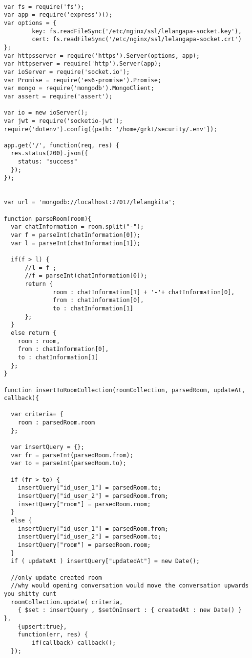 \begin{lstlisting}[label=sc-socket-chat,style=htmlcssjs,caption=Kode Sumber Implementasi Node.js + Socket.io untuk \textit{Chat}]

var fs = require('fs');
var app = require('express')();
var options = {
        key: fs.readFileSync('/etc/nginx/ssl/lelangapa-socket.key'),
        cert: fs.readFileSync('/etc/nginx/ssl/lelangapa-socket.crt')
};
var httpsserver = require('https').Server(options, app);
var httpserver = require('http').Server(app);
var ioServer = require('socket.io');
var Promise = require('es6-promise').Promise;
var mongo = require('mongodb').MongoClient;
var assert = require('assert');

var io = new ioServer();
var jwt = require('socketio-jwt');
require('dotenv').config({path: '/home/grkt/security/.env'});

app.get('/', function(req, res) {
  res.status(200).json({
    status: "success"
  });
});


var url = 'mongodb://localhost:27017/lelangkita';

function parseRoom(room){
  var chatInformation = room.split("-");
  var f = parseInt(chatInformation[0]);
  var l = parseInt(chatInformation[1]);

  if(f > l) {
      //l = f ;
      //f = parseInt(chatInformation[0]);
      return {
              room : chatInformation[1] + '-'+ chatInformation[0],
              from : chatInformation[0],
              to : chatInformation[1]
      };
  }
  else return {
    room : room,
    from : chatInformation[0],
    to : chatInformation[1]
  };
}

function insertToRoomCollection(roomCollection, parsedRoom, updateAt, callback){

  var criteria= {
    room : parsedRoom.room
  };

  var insertQuery = {};
  var fr = parseInt(parsedRoom.from);
  var to = parseInt(parsedRoom.to);

  if (fr > to) {
    insertQuery["id_user_1"] = parsedRoom.to;
    insertQuery["id_user_2"] = parsedRoom.from;
    insertQuery["room"] = parsedRoom.room;
  }
  else {
    insertQuery["id_user_1"] = parsedRoom.from;
    insertQuery["id_user_2"] = parsedRoom.to;
    insertQuery["room"] = parsedRoom.room;
  }
  if ( updateAt ) insertQuery["updatedAt"] = new Date();

  //only update created room
  //why would opening conversation would move the conversation upwards you shitty cunt
  roomCollection.update( criteria, 
    { $set : insertQuery , $setOnInsert : { createdAt : new Date() } }, 
    {upsert:true}, 
    function(err, res) {
        if(callback) callback();
  });


\end{lstlisting}
